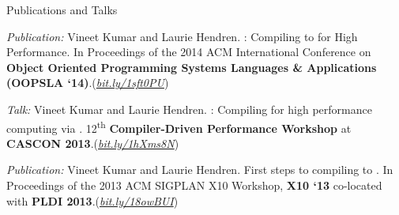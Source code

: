 \documentclass{resume} %
\begin{document}


\begin{rSection}{Publications and Talks}
\smallskip
\begin{lSubsection}


\item \emph{Publication:} Vineet Kumar and Laurie Hendren. \mixten:
Compiling \matlab to \xten for High Performance. In Proceedings of the 2014
ACM International Conference on \textbf{Object Oriented Programming Systems
Languages \& Applications (OOPSLA `14)}.(\href{http://bit.ly/1sft0PU}{\em{bit.ly/1sft0PU}})

\item \emph{Talk:} Vineet Kumar and Laurie Hendren. \mixten: Compiling \matlab
for high performance computing via \xten. 12\textsuperscript{th}
\textbf{Compiler-Driven Performance Workshop} at \textbf{CASCON
2013}.(\href{http://webdocs.cs.ualberta.ca/~amaral/cascon/CDP13/#VinetKumar}{\em{bit.ly/1hXms8N}}) 

\item \emph{Publication:} Vineet Kumar and Laurie Hendren. First steps to
compiling \matlab to \xten. In Proceedings of the 2013 ACM SIGPLAN X10
Workshop, \textbf{X10 `13} co-located with \textbf{PLDI
2013}.(\href{http://www.sable.mcgill.ca/mclab/mix10/paper.pdf}{\em{bit.ly/18owBUI}})
\end{lSubsection}
\end{rSection}

 
\end{document}
